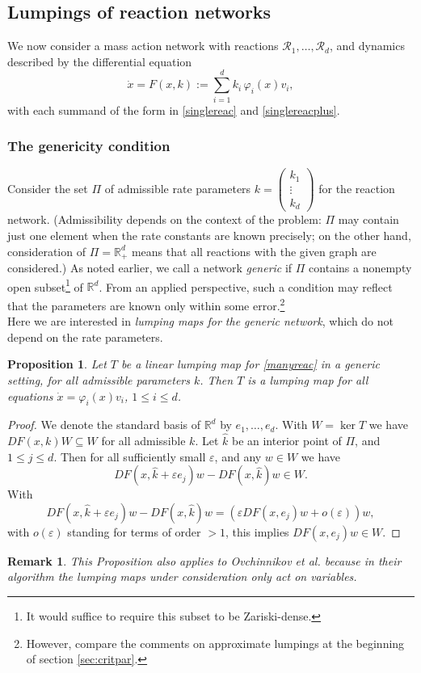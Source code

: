 \documentclass{article}
\newtheorem{remark}{Remark}
\newtheorem{proposition}{Proposition}
\begin{document}
\subsection{Lumpings of reaction networks}
We now consider a mass action network with reactions $\mathcal R_1,\ldots,\mathcal R_d$, and dynamics described by the differential equation
\begin{equation}\label{manyreac}
\dot x=F(x,k):= \sum_{i=1}^d k_i\,\varphi_i(x) v_i,
\end{equation}
with each summand of the form in \eqref{singlereac} and \eqref{singlereacplus}. 
\subsubsection{The genericity condition}
Consider the set $\Pi$ of admissible rate parameters $k=\begin{pmatrix} k_1\\ \vdots\\ k_d\end{pmatrix}$ for the reaction network. (Admissibility depends on the context of the problem: $\Pi$ may contain just one element when the rate constants are known precisely; on the other hand, consideration of $\Pi=\mathbb R_+^d$ means that all reactions with the given graph are considered.) As noted earlier, we call a network {\em generic} if $\Pi$ contains a nonempty open subset\footnote{It would suffice to require this subset to be Zariski-dense.} of $\mathbb R^d$. From an applied perspective, such a condition may reflect that the parameters are known only within some error.\footnote{However, compare the comments on approximate lumpings at the beginning of section \ref{sec:critpar}.} \\
Here we are interested in {\em lumping maps for the generic  network}, which do not depend on the rate parameters.
\begin{proposition}\label{prop:all}
Let $T$ be a linear lumping map for \eqref{manyreac} in a generic setting, for all admissible parameters $k$. Then $T$ is a lumping map for all equations $\dot x=\varphi_i(x)v_i$, $1\leq i\leq d$.
\end{proposition}
\begin{proof} We denote the standard basis of $\mathbb R^d$ by $e_1,\ldots,e_d$.
With $W=\ker T$ we have $DF(x,k)W\subseteq W$ for all admissible $k$. Let $\widehat k$ be an interior point of $\Pi$, and $1\leq j\leq d$. Then for all sufficiently small $\varepsilon$, and any $w\in W$ we have 
\[
 DF(x,\widehat k+\varepsilon e_j)w-DF(x,\widehat k)w  \in W.
\]
With
\[
 DF(x,\widehat k+\varepsilon e_j)w-DF(x,\widehat k)w = \left(\varepsilon DF(x,e_j)w+o(\varepsilon)\right)w,
\]
with $o(\varepsilon)$ standing for terms of order $>1$, this implies $DF(x,e_j)w\in W$.
\end{proof}
\begin{remark}{\em 
This Proposition also applies to Ovchinnikov et al. \cite{OVPT2021} because in their algorithm the lumping maps under consideration only act on variables.}
\end{remark}
\end{document}
